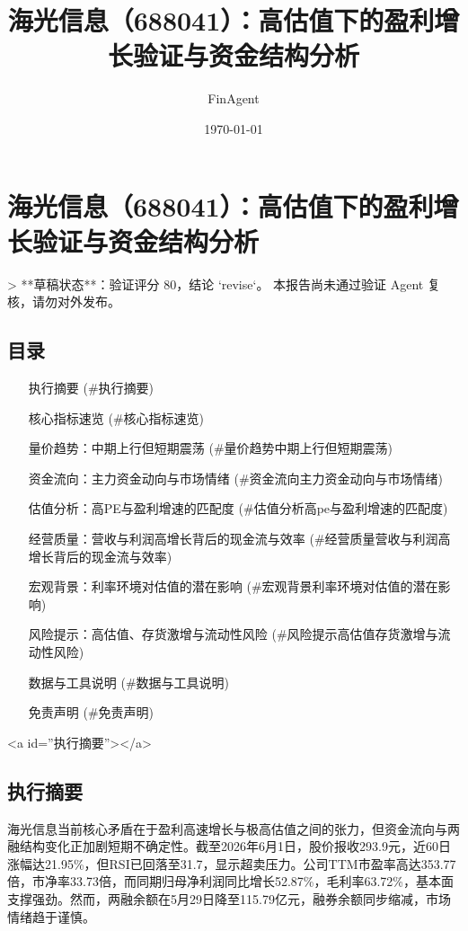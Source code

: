 \documentclass[12pt,a4paper]{article}
\title{海光信息（688041）：高估值下的盈利增长验证与资金结构分析}
\author{FinAgent}
\date{\today}
\begin{document}
\maketitle
\tableofcontents
\newpage
\sloppy
\section{海光信息（688041）：高估值下的盈利增长验证与资金结构分析}

> **草稿状态**：验证评分 80，结论 `revise`。 本报告尚未通过验证 Agent 复核，请勿对外发布。

\subsection{ 目录}

\begin{itemize}
\item [执行摘要](\#执行摘要)
\item [核心指标速览](\#核心指标速览)
\item [量价趋势：中期上行但短期震荡](\#量价趋势中期上行但短期震荡)
\item [资金流向：主力资金动向与市场情绪](\#资金流向主力资金动向与市场情绪)
\item [估值分析：高PE与盈利增速的匹配度](\#估值分析高pe与盈利增速的匹配度)
\item [经营质量：营收与利润高增长背后的现金流与效率](\#经营质量营收与利润高增长背后的现金流与效率)
\item [宏观背景：利率环境对估值的潜在影响](\#宏观背景利率环境对估值的潜在影响)
\item [风险提示：高估值、存货激增与流动性风险](\#风险提示高估值存货激增与流动性风险)
\item [数据与工具说明](\#数据与工具说明)
\item [免责声明](\#免责声明)
\end{itemize}

<a id=''执行摘要''></a>

\subsection{ 执行摘要}
海光信息当前核心矛盾在于盈利高速增长与极高估值之间的张力，但资金流向与两融结构变化正加剧短期不确定性。截至2026年6月1日，股价报收293.9元，近60日涨幅达21.95\%，但RSI已回落至31.7，显示超卖压力。公司TTM市盈率高达353.77倍，市净率33.73倍，而同期归母净利润同比增长52.87\%，毛利率63.72\%，基本面支撑强劲。然而，两融余额在5月29日降至115.79亿元，融券余额同步缩减，市场情绪趋于谨慎。
\end{document}
